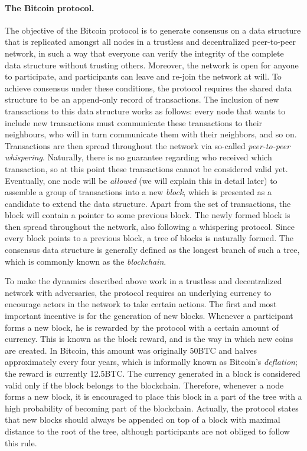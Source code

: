 \paragraph{\bf The Bitcoin protocol.} The objective of the Bitcoin protocol is to generate consensus on a data structure that is replicated amongst all nodes in a trustless 
and decentralized peer-to-peer network, in such a way that everyone %
can verify the integrity of the complete data structure without trusting others. Moreover, the network is open for anyone to participate, and participants can leave and re-join the network at will. To achieve consensus under these conditions, the protocol requires the shared data structure to be an append-only record of transactions. The inclusion of new transactions to this data structure works as follows: every node that wants to include new transactions must communicate these transactions to their neighbours, who will in turn communicate them with their neighbors, and so on. Transactions are then spread throughout the network via so-called \emph{peer-to-peer whispering}. Naturally, there is no guarantee regarding who received which transaction, so at this point these transactions cannot be considered valid yet. Eventually, one node will be \emph{allowed} (we will explain this in detail later) to assemble a group of transactions into a new \emph{block}, which is presented as a candidate to extend the data structure. Apart from the set of transactions, the block will contain a pointer to some previous block. The newly formed block is then spread throughout the network, also following a whispering protocol. Since every block points to a previous block, a tree of blocks is naturally formed. The consensus data structure is generally defined as the longest branch of such a tree, which is commonly known as the \emph{blockchain}.

To make the dynamics described above work in a trustless and decentralized network with adversaries, the protocol requires an underlying currency to encourage actors in the network to take certain actions. The first and most important incentive is for the generation of new blocks. Whenever a participant forms a new block, he is rewarded by the protocol with a certain amount of currency. This is known as the block reward, and is the way in which new coins are created. In Bitcoin, this amount was originally 50BTC and halves approximately every four years, which is informally known as Bitcoin's \emph{deflation}; the reward is currently 12.5BTC. The currency generated in a block is considered valid only if the block belongs to the blockchain.%
Therefore, whenever a node forms a new block, it is encouraged to place this block in a part of the tree with a high probability of becoming part of the blockchain. Actually, the protocol states that new blocks should always be appended on top of a block with maximal distance to the root of the tree, although participants are not obliged to follow this rule.

